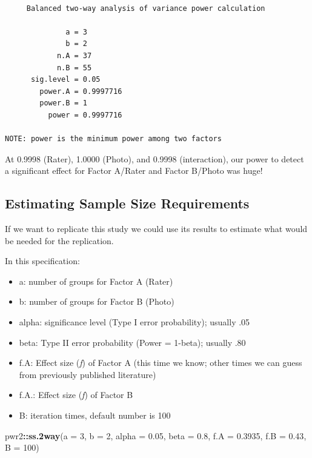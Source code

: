 \documentclass[
  11pt,
]{book}
\newenvironment{Shaded}{\begin{snugshade}}{\end{snugshade}}
\newcommand{\AttributeTok}[1]{\textcolor[rgb]{0.27,0.27,0.27}{#1}}
\newcommand{\DecValTok}[1]{\textcolor[rgb]{0.06,0.06,0.06}{#1}}
\newcommand{\FloatTok}[1]{\textcolor[rgb]{0.06,0.06,0.06}{#1}}
\newcommand{\FunctionTok}[1]{\textcolor[rgb]{0.27,0.27,0.27}{\textbf{#1}}}
\newcommand{\NormalTok}[1]{#1}
\newcommand{\SpecialCharTok}[1]{\textcolor[rgb]{0.43,0.43,0.43}{\textbf{#1}}}
\providecommand{\tightlist}{%
  \setlength{\itemsep}{0pt}\setlength{\parskip}{0pt}}
\begin{document}
\begin{verbatim}

     Balanced two-way analysis of variance power calculation 

              a = 3
              b = 2
            n.A = 37
            n.B = 55
      sig.level = 0.05
        power.A = 0.9997716
        power.B = 1
          power = 0.9997716

NOTE: power is the minimum power among two factors
\end{verbatim}

At 0.9998 (Rater), 1.0000 (Photo), and 0.9998 (interaction), our power to detect a significant effect for Factor A/Rater and Factor B/Photo was huge!

\hypertarget{estimating-sample-size-requirements}{%
\subsection{Estimating Sample Size Requirements}\label{estimating-sample-size-requirements}}

If we want to replicate this study we could use its results to estimate what would be needed for the replication.

In this specification:

\begin{itemize}
\tightlist
\item
  a: number of groups for Factor A (Rater)
\item
  b: number of groups for Factor B (Photo)
\item
  alpha: significance level (Type I error probability); usually .05
\item
  beta: Type II error probability (Power = 1-beta); usually .80
\item
  f.A: Effect size (\emph{f}) of Factor A (this time we know; other times we can guess from previously published literature)
\item
  f.A.: Effect size (\emph{f}) of Factor B
\item
  B: iteration times, default number is 100
\end{itemize}

\begin{Shaded}
\begin{Highlighting}[]
\NormalTok{pwr2}\SpecialCharTok{::}\FunctionTok{ss.2way}\NormalTok{(}\AttributeTok{a =} \DecValTok{3}\NormalTok{, }\AttributeTok{b =} \DecValTok{2}\NormalTok{, }\AttributeTok{alpha =} \FloatTok{0.05}\NormalTok{, }\AttributeTok{beta =} \FloatTok{0.8}\NormalTok{, }\AttributeTok{f.A =} \FloatTok{0.3935}\NormalTok{, }\AttributeTok{f.B =} \FloatTok{0.43}\NormalTok{,}
    \AttributeTok{B =} \DecValTok{100}\NormalTok{)}
\end{Highlighting}
\end{Shaded}
\end{document}

